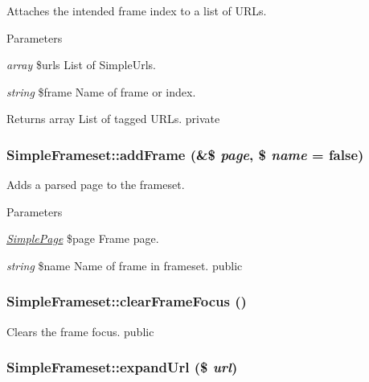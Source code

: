\label{class_simple_frameset_a24b046fe5f0522337963d458eb9bc966}
Attaches the intended frame index to a list of URLs. 
\begin{DoxyParams}{Parameters}
\item[{\em array}]\$urls List of SimpleUrls. \item[{\em string}]\$frame Name of frame or index. \end{DoxyParams}
\begin{DoxyReturn}{Returns}
array List of tagged URLs.  private 
\end{DoxyReturn}
\hypertarget{class_simple_frameset_a794b1670aa867190f08ae26e5505a67b}{
\subsubsection[{addFrame}]{\setlength{\rightskip}{0pt plus 5cm}SimpleFrameset::addFrame (\&\$ {\em page}, \/  \$ {\em name} = {\ttfamily false})}}
\label{class_simple_frameset_a794b1670aa867190f08ae26e5505a67b}
Adds a parsed page to the frameset. 
\begin{DoxyParams}{Parameters}
\item[{\em \hyperlink{class_simple_page}{SimplePage}}]\$page Frame page. \item[{\em string}]\$name Name of frame in frameset.  public \end{DoxyParams}
\hypertarget{class_simple_frameset_a9965c44c9f258c520e9b73048c09c8fb}{
\subsubsection[{clearFrameFocus}]{\setlength{\rightskip}{0pt plus 5cm}SimpleFrameset::clearFrameFocus ()}}
\label{class_simple_frameset_a9965c44c9f258c520e9b73048c09c8fb}
Clears the frame focus.  public \hypertarget{class_simple_frameset_a621c0d2d0fe4d920b879f1db4751d0ad}{
\subsubsection[{expandUrl}]{\setlength{\rightskip}{0pt plus 5cm}SimpleFrameset::expandUrl (\$ {\em url})}}
\label{class_simple_frameset_a621c0d2d0fe4d920b879f1db4751d0ad}
